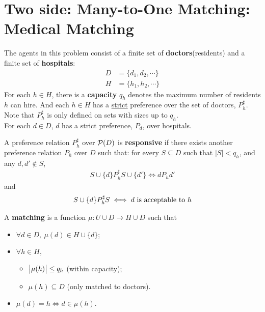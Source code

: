 \documentclass{article}
\begin{document}
	\section{Two side: Many-to-One Matching: Medical Matching}
	\begin{definition}
		The agents in this problem consist of a finite set of \textbf{doctors}(residents) and a finite set of \textbf{hospitals}:
	\begin{align}
		D &= \{d_1, d_2, \cdots \} \\
		H &= \{h_1, h_2, \cdots \}
	\end{align}
	For each $h \in H$, there is a \textbf{capacity} $q_h$ denotes the maximum number of residents $h$ can hire. And each $h \in H$ has a \ul{strict} preference over the set of doctors, $P_h^\sharp$. Note that $P_h^\sharp$ is only defined on sets with sizes up to $q_h$. \\
	For each $d \in D$, $d$ has a strict preference, $P_d$, over hospitals.
	\end{definition}
	
	\begin{definition}
		A preference relation $P_h^\sharp$ over $\mathcal{{P}}(D)$ is \textbf{responsive} if there exists another preference relation $P_h$ over $D$ such that: for every $S \subseteq D$ such that $|S| < q_h$, and any $d, d' \notin S$,
		\begin{align}
			S \cup \{d\} P_h^\sharp S \cup \{d'\} \iff d P_h d'
		\end{align}
		and
		\begin{align}
			S \cup \{d\} P_h^\sharp S \iff d \text{{ is acceptable to }} h
		\end{align}
	\end{definition}

	\begin{definition}
		A \textbf{matching} is a function $\mu: U \cup D \to H \cup D$ such that
		\begin{itemize}
			\item $\forall d \in D,\ \mu(d) \in H \cup \{d\}$;
			\item $\forall h \in H$,
			\begin{itemize}
				\item $\big \vert {\mu(h)} \big \vert \leq q_h$ (within capacity);
				\item $\mu(h) \subseteq D$ (only matched to doctors).
			\end{itemize}
			\item $\mu(d) = h \iff d \in \mu(h)$.
		\end{itemize}
	\end{definition}
	
\end{document}
